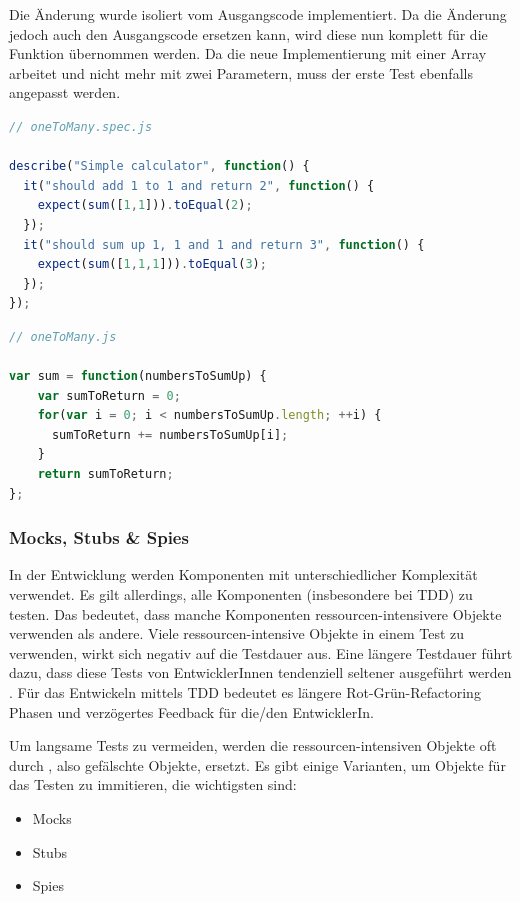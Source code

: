 Die Änderung wurde isoliert vom Ausgangscode implementiert. Da die Änderung jedoch auch den Ausgangscode ersetzen kann, wird diese nun komplett für die Funktion  übernommen werden. Da die neue Implementierung mit einer Array arbeitet und nicht mehr mit zwei Parametern, muss der erste Test ebenfalls angepasst werden.

\begin{lstlisting}[language=JavaScript, caption=TDD - One to many - 3]
// oneToMany.spec.js

describe("Simple calculator", function() {
  it("should add 1 to 1 and return 2", function() {
    expect(sum([1,1])).toEqual(2);
  });
  it("should sum up 1, 1 and 1 and return 3", function() {
    expect(sum([1,1,1])).toEqual(3);
  });
});
\end{lstlisting}

\begin{lstlisting}[language=JavaScript, caption=TDD - One to many - Implementation]
// oneToMany.js

var sum = function(numbersToSumUp) {
    var sumToReturn = 0;
    for(var i = 0; i < numbersToSumUp.length; ++i) {
      sumToReturn += numbersToSumUp[i];
    }
    return sumToReturn;
};
\end{lstlisting}

\newpage
\subsubsection{Mocks, Stubs \& Spies}
In der Entwicklung werden Komponenten mit unterschiedlicher Komplexität verwendet. Es gilt allerdings, alle Komponenten (insbesondere bei TDD) zu testen. Das bedeutet, dass manche Komponenten ressourcen-intensivere Objekte verwenden als andere. Viele ressourcen-intensive Objekte in einem Test zu verwenden, wirkt sich negativ auf die Testdauer aus. Eine längere Testdauer führt dazu, dass diese Tests von EntwicklerInnen tendenziell seltener ausgeführt werden \autocite[4]{Johansen:2011}. Für das Entwickeln mittels TDD bedeutet es längere Rot-Grün-Refactoring Phasen und verzögertes Feedback für die/den EntwicklerIn.

Um langsame Tests zu vermeiden, werden die ressourcen-intensiven Objekte oft durch , also gefälschte Objekte, ersetzt. Es gibt einige Varianten, um Objekte für das Testen zu immitieren, die wichtigsten sind:

\begin{itemize}
  \item Mocks
  \item Stubs
  \item Spies
\end{itemize}

